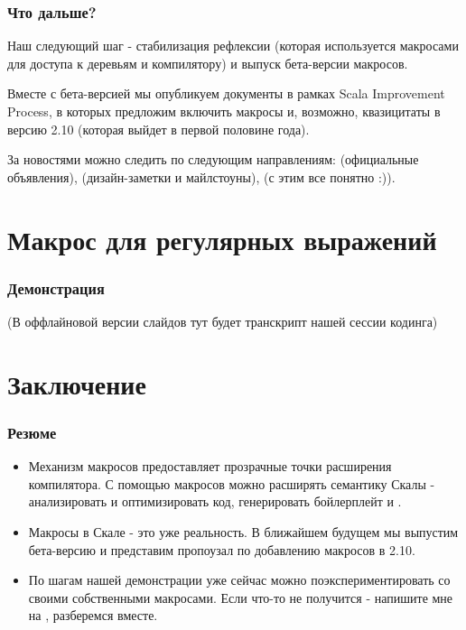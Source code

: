\documentclass[hyperref={bookmarks=false}]{beamer}
\begin{document}
\begin{frame}[t,fragile]
\frametitle{Что дальше?}

Наш следующий шаг - стабилизация рефлексии (которая используется макросами для доступа к деревьям и компилятору) и выпуск бета-версии макросов.

Вместе с бета-версией мы опубликуем документы в рамках Scala Improvement Process, в которых предложим включить макросы и, возможно, квазицитаты в версию 2.10 (которая выйдет в первой половине года).

За новостями можно следить по следующим направлениям:  (официальные объявления),  (дизайн-заметки и майлстоуны),  (с этим все понятно :)).
\end{frame}

\section{Макрос для регулярных выражений}

\begin{frame}
\frametitle{Демонстрация}
(В оффлайновой версии слайдов тут будет транскрипт нашей сессии кодинга)
\end{frame}

\section{Заключение}

\begin{frame}[t]
\frametitle{Резюме}
\begin{itemize}
\item Механизм макросов предоставляет прозрачные точки расширения компилятора. С помощью макросов можно расширять семантику Скалы - анализировать и оптимизировать код, генерировать бойлерплейт и .
\item Макросы в Скале - это уже реальность. В ближайшем будущем мы выпустим бета-версию и представим пропоузал по добавлению макросов в 2.10.
\item По шагам нашей демонстрации уже сейчас можно поэкспериментировать со своими собственными макросами. Если что-то не получится - напишите мне на , разберемся вместе.
\end{itemize}
\end{frame}
\end{document}
